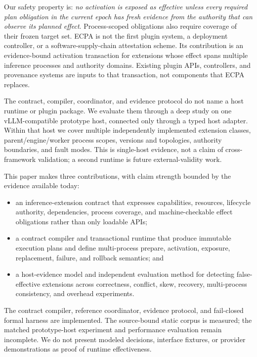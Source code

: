 \documentclass[letterpaper,twocolumn,10pt]{article}
\begin{document}
Our safety property is: \emph{no activation is exposed as effective unless
every required plan obligation in the current epoch has fresh evidence from
the authority that can observe its planned effect}.  Process-scoped obligations
also require coverage of their frozen target set.  ECPA is not the first
plugin system, a deployment controller, or a software-supply-chain attestation
scheme.  Its contribution is an evidence-bound activation transaction for
extensions whose effect spans multiple inference processes and authority
domains.  Existing plugin APIs, controllers, and provenance systems are inputs
to that transaction, not components that ECPA replaces.

The contract, compiler, coordinator, and evidence protocol do not name a host
runtime or plugin package.  We evaluate them through a deep study on one
vLLM-compatible prototype host, connected only through a typed host adapter.
Within that host we cover multiple independently implemented extension classes,
parent/engine/worker process scopes, versions and topologies, authority
boundaries, and fault modes.  This is single-host evidence, not a claim of
cross-framework validation; a second runtime is future external-validity work.

This paper makes three contributions, with claim strength bounded by
the evidence available today:
\begin{itemize}
  \item an inference-extension contract that expresses capabilities,
  resources, lifecycle authority, dependencies, process coverage, and
  machine-checkable effect obligations rather than only loadable APIs;
  \item a contract compiler and transactional runtime that produce immutable
  execution plans and define multi-process prepare, activation, exposure,
  replacement, failure, and rollback semantics; and
  \item a host-evidence model and independent evaluation method for detecting
  false-effective extensions across correctness, conflict, skew, recovery,
  multi-process consistency, and overhead experiments.
\end{itemize}
The contract compiler, reference coordinator, evidence protocol, and
fail-closed formal harness are implemented.  The source-bound static corpus is
measured; the matched prototype-host experiment and performance evaluation
remain incomplete.  We do not present modeled decisions, interface fixtures,
or provider demonstrations as proof of runtime effectiveness.
\end{document}
